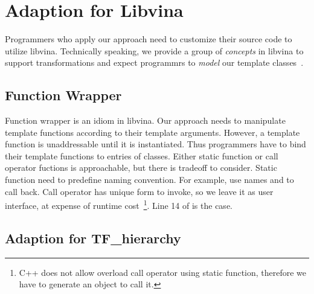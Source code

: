 

\section{Adaption for Libvina}
\label{sec:adaption}

Programmers who apply our approach need to customize their source code
to utilize libvina. Technically speaking, we provide a group of \emph{concepts}
in libvina to support transformations and expect programmrs to \textit{model} our
template classes~\cite{tempmetaprog}. 

\subsection{Function Wrapper}

Function wrapper is an idiom in libvina. Our approach needs to manipulate
template functions according to their template arguments. However, a
template function is unaddressable until it is
instantiated. Thus programmers have to bind their template functions
to entries of classes.  Either static function or call operator
fuctions is approachable, but there is tradeoff to consider.
Static function need to predefine naming convention. 
For example,  use names  and
 to call back. Call operator has unique form to invoke, so we leave it
as user interface, at expense of runtime
cost~\footnote{C++ does not allow overload call operator using static
  function, therefore we have to generate an object to call it.}. Line 14
of  is the case.


\subsection{Adaption for TF\_hierarchy}

